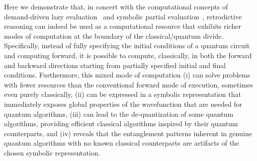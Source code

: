 \documentclass[sigplan]{acmart}
\begin{document}
Here we demonstrate that, in concert with the computational concepts
of demand-driven lazy evaluation~\cite{lazyevaluator} and symbolic
partial evaluation~\cite{futamura}, retrodictive reasoning can indeed
be used as a computational resource that exhibits richer modes of
computation at the boundary of the classical/quantum
divide. Specifically, instead of fully specifying the initial
conditions of a quantum circuit and computing forward, it is possible
to compute, classically, in both the forward and backward directions
starting from partially specified initial and final
conditions. Furthermore, this mixed mode of computation (i) can solve
problems with fewer resources than the conventional forward mode of
execution, sometimes even purely classically, (ii) can be expressed in
a symbolic representation that immediately exposes global properties
of the wavefunction that are needed for quantum algorithms, (iii) can
lead to the de-quantization of some quantum algorithms, providing
efficient classical algorithms inspired by their quantum counterparts,
and (iv) reveals that the entanglement patterns inherent in genuine
quantum algorithms with no known classical counterparts are artifacts
of the chosen symbolic representation.
\end{document}

